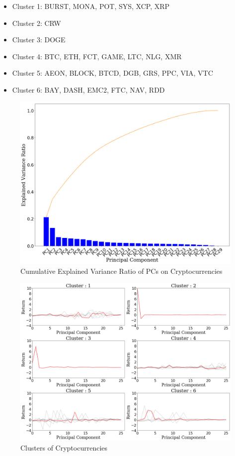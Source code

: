 \documentclass[11pt]{article} %
\theoremstyle{plain}
\theoremstyle{definition}
\begin{document}
\begin{itemize}
    \item Cluster 1: BURST, MONA, POT, SYS, XCP, XRP
    \item Cluster 2: CRW
    \item Cluster 3: DOGE
    \item Cluster 4: BTC, ETH, FCT, GAME, LTC, NLG, XMR
    \item Cluster 5: AEON, BLOCK, BTCD, DGB, GRS, PPC, VIA, VTC
    \item Cluster 6: BAY, DASH, EMC2, FTC, NAV, RDD
\end{itemize}

\begin{figure}[ht]
    \includegraphics[width=1\linewidth, center]{resources/crypto_pca_explained.png}
    \caption{Cumulative Explained Variance Ratio of PCs on Cryptocurrencies}
    \label{fig:cryptopca}
\end{figure}

\begin{figure}[ht]
    \includegraphics[width=1\linewidth, center]{resources/crypto_kmeans.png}
    \caption{Clusters of Cryptocurrencies}
    \label{fig:cryptokmeans}
\end{figure}
\end{document}
